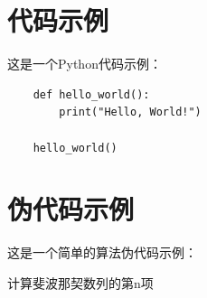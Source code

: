 \documentclass{ranfr}
\begin{document}
\section{代码示例}

这是一个Python代码示例：

\begin{verbatim}
    def hello_world():
        print("Hello, World!")

    hello_world()
\end{verbatim}

\section{伪代码示例}

这是一个简单的算法伪代码示例：

\begin{algorithm}[H]
    \caption{计算斐波那契数列的第n项}
\end{algorithm}
\end{document}
